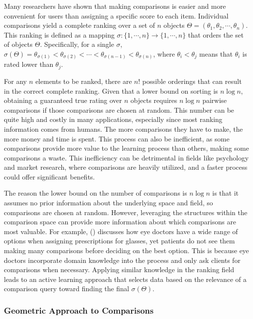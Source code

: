 \documentclass[
  letterpaper,
  numbers=noenddot,
  DIV=11]{scrreprt}
\theoremstyle{definition}
\theoremstyle{plain}
\theoremstyle{plain}
\theoremstyle{remark}
\begin{document}
Many researchers have shown that making comparisons is easier and more
convenient for users than assigning a specific score to each item.
Individual comparisons yield a complete ranking over a set of \(n\)
objects \(\Theta = (\theta_1, \theta_2, \cdots, \theta_n)\). This
ranking is defined as a mapping
\(\sigma : \{1, \cdots, n\} \rightarrow \{1,\cdots, n\}\) that orders
the set of objects \(\Theta\). Specifically, for a single \(\sigma\),
\(\sigma(\Theta) = \theta_{\sigma(1)} < \theta_{\sigma(2)} < \cdots < \theta_{\sigma(n-1)} < \theta_{\sigma(n)}\),
where \(\theta_{i} < \theta_{j}\) means that \(\theta_{i}\) is rated
lower than \(\theta_{j}\).

For any \(n\) elements to be ranked, there are \(n!\) possible orderings
that can result in the correct complete ranking. Given that a lower
bound on sorting is \(n\log n\), obtaining a guaranteed true rating over
\(n\) objects requires \(n\log n\) pairwise comparisons if those
comparisons are chosen at random. This number can be quite high and
costly in many applications, especially since most ranking information
comes from humans. The more comparisons they have to make, the more
money and time is spent. This process can also be inefficient, as some
comparisons provide more value to the learning process than others,
making some comparisons a waste. This inefficiency can be detrimental in
fields like psychology and market research, where comparisons are
heavily utilized, and a faster process could offer significant benefits.

The reason the lower bound on the number of comparisons is \(n\log n\)
is that it assumes no prior information about the underlying space and
field, so comparisons are chosen at random. However, leveraging the
structures within the comparison space can provide more information
about which comparisons are most valuable. For example,
() discusses how eye doctors
have a wide range of options when assigning prescriptions for glasses,
yet patients do not see them making many comparisons before deciding on
the best option. This is because eye doctors incorporate domain
knowledge into the process and only ask clients for comparisons when
necessary. Applying similar knowledge in the ranking field leads to an
active learning approach that selects data based on the relevance of a
comparison query toward finding the final \(\sigma(\Theta)\).

\subsubsection*{Geometric Approach to
Comparisons}\label{geometric-approach-to-comparisons}
\end{document}
